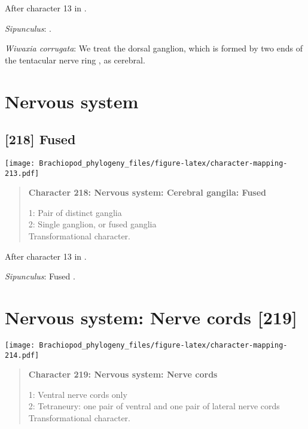 \documentclass[openany]{book}
\theoremstyle{definition}
\theoremstyle{definition}
\theoremstyle{definition}
\theoremstyle{remark}
\begin{document}
After character 13 in \citet{Haszprunar1996}.

\hypertarget{Sipunculus-coding-217}{}
\emph{Sipunculus}: \citet{Temereva2016Thenervous}.

\hypertarget{Wiwaxia_corrugata-coding-217}{}
\emph{Wiwaxia corrugata}: We treat the dorsal ganglion, which is formed
by two ends of the tentacular nerve ring \citep{Temereva2016Phoronida},
as cerebral.

\section{Nervous system}\label{nervous-system-1}

\subsection*{{[}218{]} Fused}\label{fused}

\texttt{[image: Brachiopod\_phylogeny\_files/figure-latex/character-mapping-213.pdf]}

\begin{quote}
\textbf{Character 218: Nervous system: Cerebral gangila: Fused}

1: Pair of distinct ganglia\\
2: Single ganglion, or fused ganglia\\
Transformational character.
\end{quote}

After character 13 in \citet{Haszprunar1996}.

\hypertarget{Sipunculus-coding-218}{}
\emph{Sipunculus}: Fused \citep{Temereva2016Thenervous}.

\section{Nervous system: Nerve cords
{[}219{]}}\label{nervous-system-nerve-cords-219}

\texttt{[image: Brachiopod\_phylogeny\_files/figure-latex/character-mapping-214.pdf]}

\begin{quote}
\textbf{Character 219: Nervous system: Nerve cords}

1: Ventral nerve cords only\\
2: Tetraneury: one pair of ventral and one pair of lateral nerve cords\\
Transformational character.
\end{quote}
\end{document}
